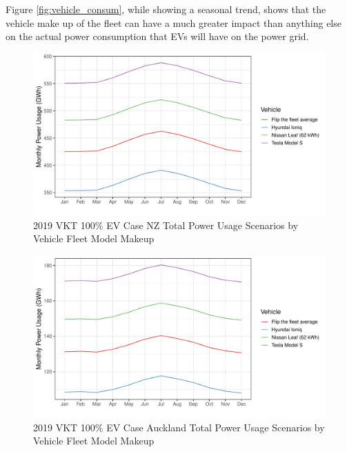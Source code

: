 \documentclass[
]{article}
\begin{document}
Figure \ref{fig:vehicle_consum}, while showing a seasonal trend, shows
that the vehicle make up of the fleet can have a much greater impact
than anything else on the actual power consumption that EVs will have on
the power grid.

\begin{figure}
\centering
\includegraphics{summary_week4_files/figure-latex/vehicle_power_usage-1.pdf}
\caption{2019 VKT 100\% EV Case NZ Total Power Usage Scenarios by
Vehicle Fleet Model Makeup\label{fig:vehicle_power_usage}}
\end{figure}

\begin{figure}
\centering
\includegraphics{summary_week4_files/figure-latex/vehicle_power_usage_auck-1.pdf}
\caption{2019 VKT 100\% EV Case Auckland Total Power Usage Scenarios by
Vehicle Fleet Model Makeup\label{fig:vehicle_power_usage_auck}}
\end{figure}
\end{document}

